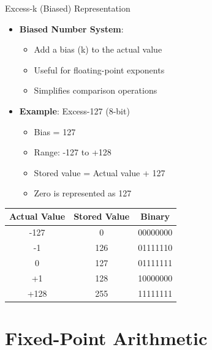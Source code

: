 \documentclass[aspectratio=169,11pt]{beamer}
\newcommand{\concept}[1]{\textbf{\color{accentcolor}#1}}
\begin{document}
\begin{frame}{Excess-k (Biased) Representation}
\begin{itemize}
\item \concept{Biased Number System}:
\begin{itemize}
\item Add a bias (k) to the actual value
\item Useful for floating-point exponents
\item Simplifies comparison operations
\end{itemize}
\vspace{0.5cm}
\item \concept{Example}: Excess-127 (8-bit)
\begin{itemize}
\item Bias = 127
\item Range: -127 to +128
\item Stored value = Actual value + 127
\item Zero is represented as 127
\end{itemize}
\end{itemize}

\vspace{0.3cm}
\begin{center}
\begin{tabular}{|c|c|c|}
\hline
\textbf{Actual Value} & \textbf{Stored Value} & \textbf{Binary} \\
\hline
-127 & 0 & 00000000 \\
-1 & 126 & 01111110 \\
0 & 127 & 01111111 \\
+1 & 128 & 10000000 \\
+128 & 255 & 11111111 \\
\hline
\end{tabular}
\end{center}
\end{frame}

\section{Fixed-Point Arithmetic}
\end{document}
